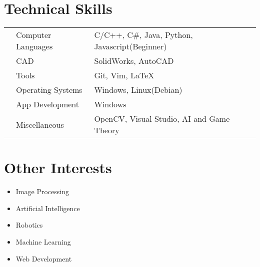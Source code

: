 \documentclass[11pt,a4paper]{moderncv}
\begin{document}
  \section{Technical Skills}
  \begin{tabular}{L{0.05cm} L{6cm} l}
      & Computer Languages   & C/C++, C\#, Java, Python, Javascript(Beginner)\\
      & CAD                  & SolidWorks, AutoCAD \\
      & Tools                & Git, Vim, \LaTeX \\
      & Operating Systems    & Windows, Linux(Debian)\\
      & App Development      & Windows \\
      & Miscellaneous        & OpenCV, Visual Studio, AI and Game Theory
    \end{tabular}
  \section{Other Interests}
    \begin {itemize}
      \item Image Processing
      \item Artificial Intelligence
      \item Robotics
      \item Machine Learning
      \item Web Development
    \end{itemize}
\end{document}
